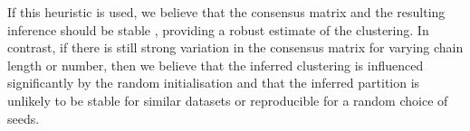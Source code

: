 \documentclass{bmcart}
\begin{document}



If this heuristic is used, we believe that the consensus matrix and the resulting inference should be stable \citep[see, e.g.,][]{von2005towards, meinshausen2010stability}, providing a robust estimate of the clustering. In contrast, if there is still strong variation in the consensus matrix for varying chain length or number, then we believe that the inferred clustering is influenced significantly by the random initialisation and that the inferred partition is unlikely to be stable for similar datasets or reproducible for a random choice of seeds.
\end{document}
